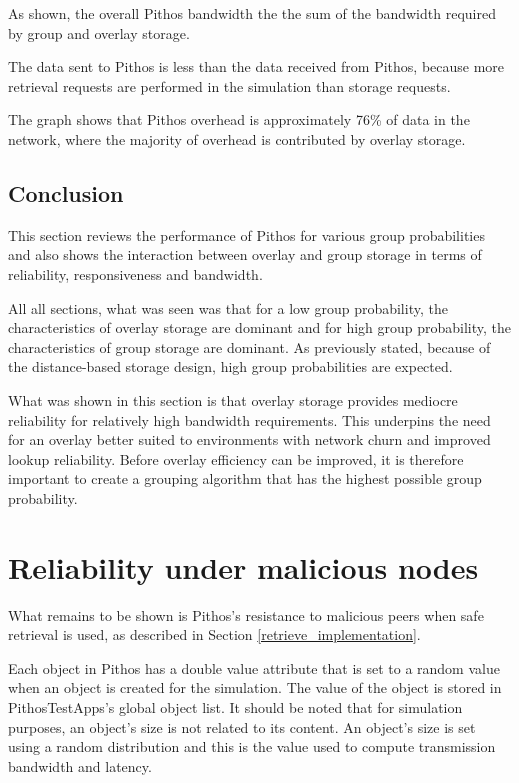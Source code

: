 As shown, the overall Pithos bandwidth the the sum of the bandwidth required by group and overlay storage.

The data sent to Pithos is less than the data received from Pithos, because more retrieval requests are performed in the simulation than storage requests.

The graph shows that Pithos overhead is approximately 76\% of data in the network, where the majority of overhead is contributed by overlay storage.

\subsection{Conclusion}

This section reviews the performance of Pithos for various group probabilities and also shows the interaction between overlay and group storage in terms of reliability, responsiveness and bandwidth.

All all sections, what was seen was that for a low group probability, the characteristics of overlay storage are dominant and for high group probability, the characteristics of group storage are dominant. As previously stated, because of the distance-based storage design, high group probabilities are expected.

What was shown in this section is that overlay storage provides mediocre reliability for relatively high bandwidth requirements. This underpins the need for an overlay better suited to environments with network churn and improved lookup reliability. Before overlay efficiency can be improved, it is therefore important to create a grouping algorithm that has the highest possible group probability.

\section{Reliability under malicious nodes}
\label{malicious_results}

What remains to be shown is Pithos's resistance to malicious peers when safe retrieval is used, as described in Section \ref{retrieve_implementation}.

Each object in Pithos has a double value attribute that is set to a random value when an object is created for the simulation. The value of the object is stored in PithosTestApps's global object list. It should be noted that for simulation purposes, an object's size is not related to its content. An object's size is set using a random distribution and this is the value used to compute transmission bandwidth and latency.

